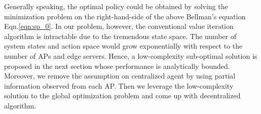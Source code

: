 Generally speaking, the optimal policy could be obtained by solving the minimization problem on the right-hand-side of the above Bellman's equation Eqn.\ref{eqn:sp_0}.
In our problem, however, the conventional value iteration algorithm is intractable due to the tremendous state space.
The number of system states and action space would grow exponentially with respect to the number of APs and edge servers.
Hence, a low-complexity sub-optimal solution is proposed in the next section whose performance is analytically bounded.
Moreover, we remove the assumption on centralized agent by using partial information observed from each AP.
Then we leverage the low-complexity solution to the global optimization problem and come up with decentralized algorithm.
